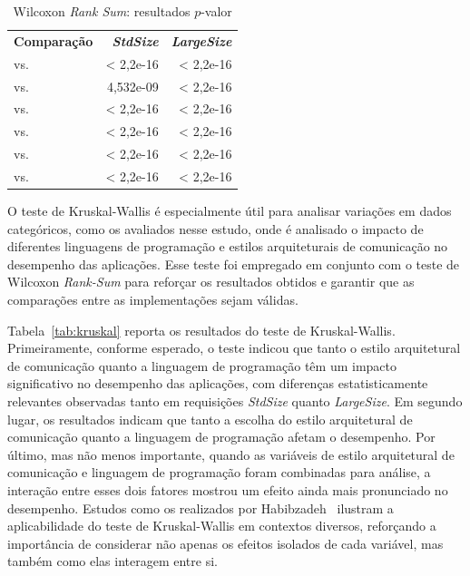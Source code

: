 \begin{table}[!ht]
    \centering
    \small
    \caption{Wilcoxon {\em Rank Sum}: resultados $p$-valor }
    \vspace{-6pt}
    \begin{tabular}{lrr}
        \textbf{Comparação} & \textbf{\textit{StdSize}} & \textbf{\textit{LargeSize}} \\
        \javarest{} vs. \javagrpc{} & < 2,2e-16 & < 2,2e-16\\
        \javarest{} vs. \gorest{} & 4,532e-09 & < 2,2e-16\\
        \javarest{} vs. \gogrpc{} & < 2,2e-16 & < 2,2e-16\\
        \javagrpc{} vs. \gorest{} & < 2,2e-16 & < 2,2e-16\\
        \javagrpc{} vs. \gogrpc{} & < 2,2e-16 & < 2,2e-16\\
        \gorest{} vs. \gogrpc{} & < 2,2e-16 & < 2,2e-16\\
    \end{tabular}
    \label{tab:wilcoxon}
\end{table}

O teste de Kruskal-Wallis é especialmente útil para analisar variações em dados categóricos, como os avaliados nesse estudo, onde é analisado o impacto de diferentes linguagens de programação e estilos arquiteturais de comunicação no desempenho das aplicações.
%
{Esse teste foi empregado em conjunto com o teste de Wilcoxon \textit{Rank-Sum} para reforçar os resultados obtidos e garantir que as comparações entre as implementações sejam válidas.}

Tabela~\ref{tab:kruskal} reporta os resultados do teste de Kruskal-Wallis. Primeiramente, conforme esperado, o teste indicou que tanto o estilo arquitetural de comunicação quanto a linguagem de programação têm um impacto significativo no desempenho das aplicações, com diferenças estatisticamente relevantes observadas tanto em requisições \textit{StdSize} quanto \textit{LargeSize}.
Em segundo lugar, os resultados indicam que tanto a escolha do estilo arquitetural de comunicação quanto a linguagem de programação  afetam o desempenho.
Por último, mas não menos importante, quando as variáveis de estilo arquitetural de comunicação e linguagem de programação foram combinadas para análise, a interação entre esses dois fatores mostrou um efeito ainda mais pronunciado no desempenho.
%
Estudos como os realizados por Habibzadeh~\cite{Habibzadeh2024} ilustram a aplicabilidade do teste de Kruskal-Wallis em contextos diversos, reforçando a importância de considerar não apenas os efeitos isolados de cada variável, mas também como elas interagem entre si.\\[-0.3cm]


